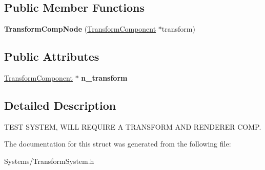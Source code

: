 \subsection*{Public Member Functions}
\begin{DoxyCompactItemize}
\item 
\mbox{\label{structTransformCompNode_a064e940cfc15e4ab2b78f69100b40b3b}} 
{\bfseries Transform\+Comp\+Node} (\hyperlink{classTransformComponent}{Transform\+Component} $\ast$transform)
\end{DoxyCompactItemize}
\subsection*{Public Attributes}
\begin{DoxyCompactItemize}
\item 
\mbox{\label{structTransformCompNode_add16d2c983b15c22343deb038cdad92e}} 
\hyperlink{classTransformComponent}{Transform\+Component} $\ast$ {\bfseries n\+\_\+transform}
\end{DoxyCompactItemize}


\subsection{Detailed Description}
T\+E\+ST S\+Y\+S\+T\+EM, W\+I\+LL R\+E\+Q\+U\+I\+RE A T\+R\+A\+N\+S\+F\+O\+RM A\+ND R\+E\+N\+D\+E\+R\+ER C\+O\+MP. 

The documentation for this struct was generated from the following file\+:\begin{DoxyCompactItemize}
\item 
Systems/Transform\+System.\+h\end{DoxyCompactItemize}
